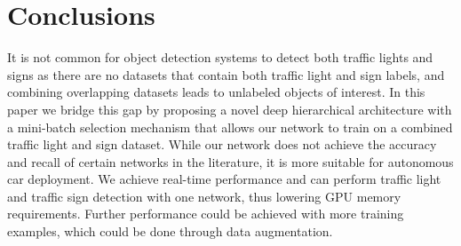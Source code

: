 \documentclass[10pt, conference, compsocconf]{IEEEtran}
\begin{document}
\section{Conclusions} \label{conclusion}
It is not common for object detection systems to detect both traffic lights and signs as there are no datasets that contain both traffic light and sign labels, and combining overlapping datasets leads to unlabeled objects of interest. In this paper we bridge this gap by proposing a novel deep hierarchical architecture with a mini-batch selection mechanism that allows our network to train on a combined traffic light and sign dataset. While our network does not achieve the accuracy and recall of certain networks in the literature, it is more suitable for autonomous car deployment. We achieve real-time performance and can perform traffic light and traffic sign detection with one network, thus lowering GPU memory requirements. Further performance could be achieved with more training examples, which could be done through data augmentation.

{\small


}
\end{document}
